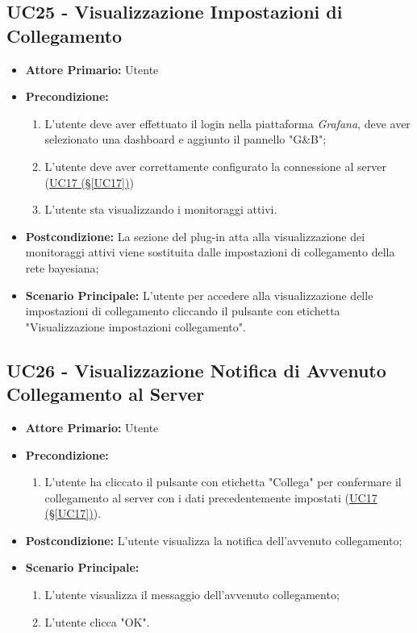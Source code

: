 \pagebreak

\subsection{UC25 - Visualizzazione Impostazioni di Collegamento}\label{UC25}
\begin{itemize}
	\item \textbf{Attore Primario:} Utente
	\item \textbf{Precondizione:} 
	\begin{enumerate}
		\item L'utente deve aver effettuato il login nella piattaforma \textit{Grafana}, deve aver selezionato una dashboard e aggiunto il pannello "G\&B";
		\item L'utente deve aver correttamente configurato la connessione al server (\hyperref[UC17]{UC17 (§\ref*{UC17})})
		\item L'utente sta visualizzando i monitoraggi attivi.
	\end{enumerate}
	\item \textbf{Postcondizione:} La sezione del plug-in atta alla visualizzazione dei monitoraggi attivi viene sostituita dalle impostazioni di collegamento della rete bayesiana;
	\item \textbf{Scenario Principale:} L'utente per accedere alla visualizzazione delle impostazioni di collegamento cliccando il pulsante con etichetta "Visualizzazione impostazioni collegamento".
\end{itemize}

\pagebreak

\subsection{UC26 - Visualizzazione Notifica di Avvenuto Collegamento al Server}\label{UC26}

\begin{itemize}
	\item \textbf{Attore Primario:}  Utente
	\item \textbf{Precondizione:}
	\begin{enumerate}
		\item L'utente ha cliccato il pulsante con etichetta "Collega" per confermare il collegamento al server con i dati precedentemente impostati (\hyperref[UC17]{UC17 (§\ref*{UC17})}).
	\end{enumerate}
	\item \textbf{Postcondizione:} L'utente visualizza la notifica dell'avvenuto collegamento;
	\item \textbf{Scenario Principale:}
	\begin{enumerate}
		\item L'utente visualizza il messaggio dell'avvenuto collegamento;
		\item L'utente clicca "OK".
	\end{enumerate}
\end{itemize}

